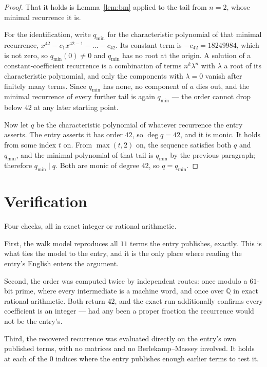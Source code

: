 \documentclass[11pt,a4paper]{article}
\theoremstyle{plain}
\theoremstyle{definition}
\begin{document}
\begin{proof}
That it holds is Lemma~\ref{lem:bm} applied to the tail from $n=2$, whose minimal
recurrence it is.

For the identification, write $q_{\min}$ for the characteristic polynomial of that minimal
recurrence, $x^{42}-c_1x^{42-1}-\dots-c_{42}$. Its constant term is
$-c_{42}=18249984$, which is not zero, so $q_{\min}(0)\neq0$ and $q_{\min}$ has no
root at the origin. A solution of a constant-coefficient recurrence is a combination of terms
$n^{k}\lambda^{n}$ with $\lambda$ a root of its characteristic polynomial, and only the
components with $\lambda=0$ vanish after finitely many terms. Since $q_{\min}$ has none, no
component of $a$ dies out, and the minimal recurrence of every further tail is again
$q_{\min}$ --- the order cannot drop below $42$ at any later starting point.

Now let $q$ be the characteristic polynomial of whatever recurrence the entry asserts. The
entry asserts it has order $42$, so $\deg q=42$, and it is monic. It holds from some
index $t$ on. From $\max(t,2)$ on, the sequence satisfies both $q$ and $q_{\min}$, and
the minimal polynomial of that tail is $q_{\min}$ by the previous paragraph; therefore
$q_{\min}\mid q$. Both are monic of degree $42$, so $q=q_{\min}$.
\end{proof}

\section{Verification}

Four checks, all in exact integer or rational arithmetic.

First, the walk model reproduces all $11$ terms the entry publishes, exactly. This is
what ties the model to the entry, and it is the only place where reading the entry's English
enters the argument.

Second, the order was computed twice by independent routes: once modulo a $61$-bit prime, where
every intermediate is a machine word, and once over $\mathbb{Q}$ in exact rational arithmetic.
Both return $42$, and the exact run additionally confirms every coefficient is an integer
--- had any been a proper fraction the recurrence would not be the entry's.

Third, the recovered recurrence was evaluated directly on the entry's own published terms, with
no matrices and no Berlekamp--Massey involved. It holds at each of the $0$ indices where
the entry publishes enough earlier terms to test it.
\end{document}
